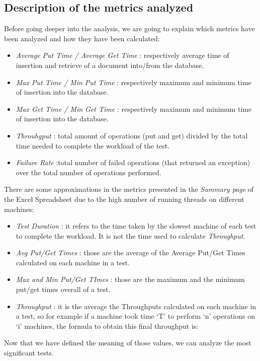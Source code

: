 \subsection{Description of the metrics analyzed}
Before going deeper into the analysis, we are going to explain which metrics have been analyzed and how they have been calculated:
\begin{itemize}
	\item \textit{Average Put Time / Average Get Time} : respectively average time of insertion and retrieve of a document into/from the database.
	\item \textit{Max Put Time / Min Put Time} : respectively maximum and minimum time of insertion into the database.
	\item \textit{Max Get Time / Min Get Time} : respectively maximum and minimum time of insertion into the database.
	\item \textit{Throuhgput} : total amount of operations (put and get) divided by the total time needed to complete the workload of the test.
	\item \textit{Failure Rate} :total number of failed operations (that returned an exception) over the total number of operations performed.
\end{itemize}
There are some approximations in the metrics presented in the \textit{Summary page} of the Excel Spreadsheet due to the high number of running threads on different machines:
\begin{itemize}
	\item \textit{Test Duration} : it refers to the time taken by the slowest machine of each test to complete the workload. It is not the time used to calculate \textit{Throughput}.
	\item \textit{Avg Put/Get Times} : those are the average of the Average Put/Get Times calculated on each machine in a test.
	\item \textit{Max and Min Put/Get TImes} : those are the maximum and the minimum put/get times overall of a test.
	\item \textit{Throughput} : it is the average the Throughputs calculated on each machine in a test, so for example if a machine took time ‘T’ to perform ‘n’ operations on ‘i’ machines, the formula to obtain this final throughput is: %
\end{itemize}
Now that we have defined the meaning of those values, we can analyze the most significant tests.
